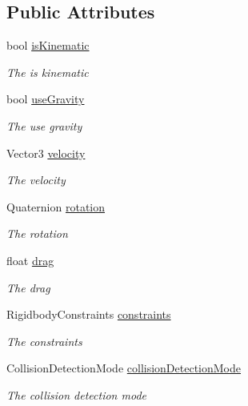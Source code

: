 \subsection*{Public Attributes}
\begin{DoxyCompactItemize}
\item 
bool \hyperlink{class_serialize_rigid_body_1_1_rigid_body_info_ae4d274291824c57f9d225e92ef1edd8d}{is\+Kinematic}
\begin{DoxyCompactList}\small\item\em The is kinematic \end{DoxyCompactList}\item 
bool \hyperlink{class_serialize_rigid_body_1_1_rigid_body_info_af6f26eebc08d81405ee2e7b37cfb2eee}{use\+Gravity}
\begin{DoxyCompactList}\small\item\em The use gravity \end{DoxyCompactList}\item 
Vector3 \hyperlink{class_serialize_rigid_body_1_1_rigid_body_info_a07a18b9ed30158bf30e0b4bf4d72db51}{velocity}
\begin{DoxyCompactList}\small\item\em The velocity \end{DoxyCompactList}\item 
Quaternion \hyperlink{class_serialize_rigid_body_1_1_rigid_body_info_ad468967fbc9ee897b5fa054a0cf5df30}{rotation}
\begin{DoxyCompactList}\small\item\em The rotation \end{DoxyCompactList}\item 
float \hyperlink{class_serialize_rigid_body_1_1_rigid_body_info_a9a20a62a11a380d01a338d2ea2df3386}{drag}
\begin{DoxyCompactList}\small\item\em The drag \end{DoxyCompactList}\item 
Rigidbody\+Constraints \hyperlink{class_serialize_rigid_body_1_1_rigid_body_info_a38479b3970e04a64c1fa5d14c741e08d}{constraints}
\begin{DoxyCompactList}\small\item\em The constraints \end{DoxyCompactList}\item 
Collision\+Detection\+Mode \hyperlink{class_serialize_rigid_body_1_1_rigid_body_info_ad2044aa495406045b261545eca0e29b3}{collision\+Detection\+Mode}
\begin{DoxyCompactList}\small\item\em The collision detection mode \end{DoxyCompactList}\item 

\end{DoxyCompactItemize}
